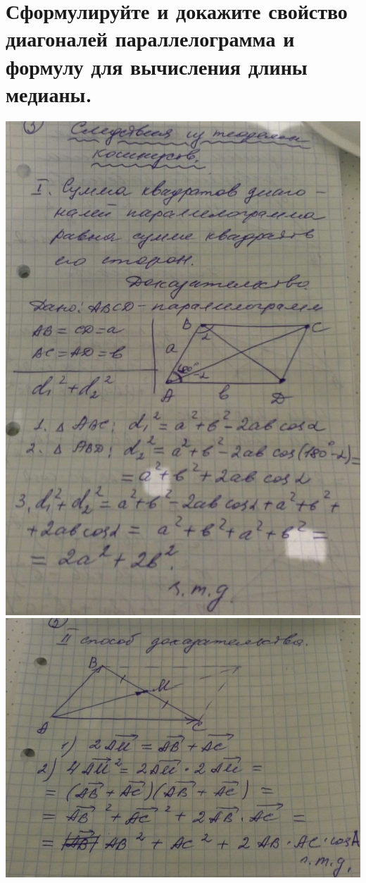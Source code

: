 \documentclass[12pt, letterpaper]{article}
\begin{document}
\section {Сформулируйте и докажите свойство диагоналей параллелограмма и формулу для вычисления длины медианы.}
\includegraphics[scale=0.3]{bilet16.jpg} \\
\includegraphics[scale=0.3]{bilet16-1.jpg} \\
\end{document}
